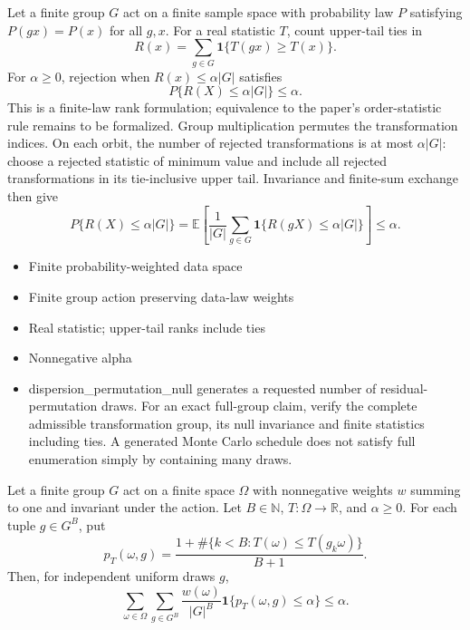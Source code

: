 \expandafter\def\csname statadic@statement@STATADIC-RANDOMIZATION-001\endcsname{Let a finite group $G$ act on a finite sample space with
  probability law $P$ satisfying $P(gx)=P(x)$ for all $g,x$. For a real statistic
  $T$, count upper-tail ties in
  \[
    R(x)=\sum_{g\in G}\mathbf{1}\{T(gx)\ge T(x)\}.
  \]
  For $\alpha\ge0$, rejection when $R(x)\le\alpha |G|$ satisfies
  \[
    P\{R(X)\le\alpha |G|\}\le\alpha.
  \]
  This is a finite-law rank formulation; equivalence to the paper's
  order-statistic rule remains to be formalized.}
\expandafter\def\csname statadic@proof@STATADIC-RANDOMIZATION-001\endcsname{Group multiplication permutes the transformation indices. On
  each orbit, the number of rejected transformations is at most $\alpha|G|$:
  choose a rejected statistic of minimum value and include all rejected
  transformations in its tie-inclusive upper tail. Invariance and finite-sum
  exchange then give
  \[
    P\{R(X)\le\alpha|G|\}
      =\mathbb{E}\left[\frac{1}{|G|}\sum_{g\in G}
        \mathbf{1}\{R(gX)\le\alpha|G|\}\right]\le\alpha.
  \]}
\expandafter\def\csname statadic@assumptions@STATADIC-RANDOMIZATION-001\endcsname{\begin{itemize}
\item Finite probability-weighted data space
\item Finite group action preserving data-law weights
\item Real statistic; upper-tail ranks include ties
\item Nonnegative alpha
\end{itemize}}
\expandafter\def\csname statadic@diagnostics@STATADIC-RANDOMIZATION-001\endcsname{\begin{itemize}
\item dispersion\_permutation\_null generates a requested number of residual-permutation draws. For an exact full-group claim, verify the complete admissible transformation group, its null invariance and finite statistics including ties. A generated Monte Carlo schedule does not satisfy full enumeration simply by containing many draws.
\end{itemize}}
\expandafter\def\csname statadic@statement@STATADIC-RANDOMIZATION-002\endcsname{Let a finite group $G$ act on a finite space $\Omega$ with
  nonnegative weights $w$ summing to one and invariant under the action. Let
  $B\in\mathbb N$, $T:\Omega\to\mathbb R$, and $\alpha\ge0$. For each tuple
  $g\in G^B$, put
  \[
  p_T(\omega,g)=\frac{1+\#\{k<B:T(\omega)\le T(g_k\omega)\}}{B+1}.
  \]
  Then, for independent uniform draws $g$,
  \[
  \sum_{\omega\in\Omega}\sum_{g\in G^B}
  \frac{w(\omega)}{|G|^B}\mathbf1\{p_T(\omega,g)\le\alpha\}\le\alpha.
  \]}
